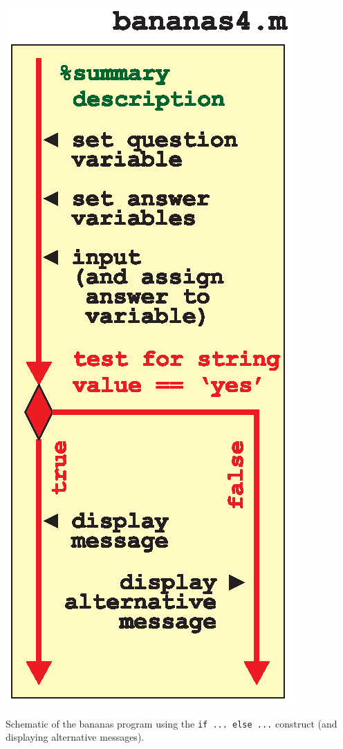 \documentclass{tufte-book} %
\begin{document}
\begin{marginfigure}[-0.25in]
\includegraphics[width=\linewidth]{ch2-bananas4.eps}
\caption{Schematic of the bananas program using the \texttt{if ... else ...} construct (and displaying alternative messages).}
\label{fig:ch2-bananas4}
\end{marginfigure}
\end{document}
